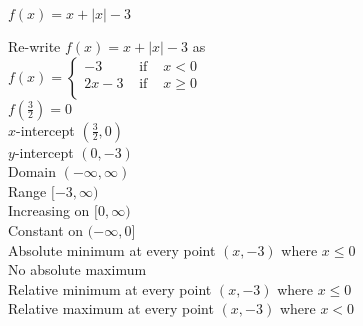 {$f(x) = x+|x| - 3$}
{Re-write $f(x) = x+|x| - 3$ as \\ ${\displaystyle f(x) = \left\{ \begin{array}{rcl}
-3 & \mbox{ if } & x < 0\\
     2x -3 & \mbox{ if } & x \geq 0 \\ \end{array} \right. }$ \\ $f\left(\frac{3}{2}\right) = 0$ \\ $x$-intercept $\left(\frac{3}{2}, 0\right)$ \\ $y$-intercept $(0,-3)$ \\ Domain $(-\infty, \infty)$ \\ Range $[-3, \infty)$ \\ Increasing on $[0,\infty)$ \\ Constant on $(-\infty, 0]$ \\ Absolute minimum at every point $(x,-3)$ where $x \leq 0$ \\ No absolute maximum \\ Relative minimum at every point $(x, -3)$ where $x \leq 0$ \\ Relative maximum at every point $(x, -3)$ where $x < 0$ 

\begin{center}
\end{center}}